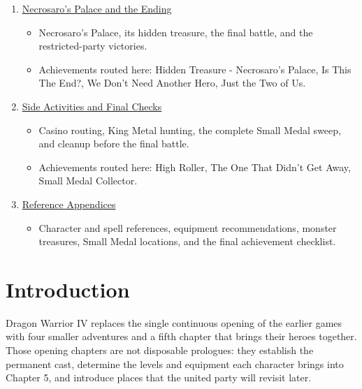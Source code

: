 \documentclass[
  american,
  10pt,
  letterpaper,
  oneside,
  open=any]{scrreprt}
\providecommand{\tightlist}{%
  \setlength{\itemsep}{0pt}\setlength{\parskip}{0pt}}
\begin{document}
\begin{enumerate}
  \begin{itemize}
  \tightlist
  \item
    The Final Cave, the Last Refuge, and the four barrier shrines.
  \item
    Achievements routed here: And Then There Were None.
  \end{itemize}
\item
  \hyperref[necrosaros-palace-and-the-ending]{Necrosaro's Palace and the
  Ending}

  \begin{itemize}
  \tightlist
  \item
    Necrosaro's Palace, its hidden treasure, the final battle, and the
    restricted-party victories.
  \item
    Achievements routed here: Hidden Treasure - Necrosaro's Palace, Is
    This The End?, We Don't Need Another Hero, Just the Two of Us.
  \end{itemize}
\item
  \hyperref[side-activities-and-final-checks]{Side Activities and Final
  Checks}

  \begin{itemize}
  \tightlist
  \item
    Casino routing, King Metal hunting, the complete Small Medal sweep,
    and cleanup before the final battle.
  \item
    Achievements routed here: High Roller, The One That Didn't Get Away,
    Small Medal Collector.
  \end{itemize}
\item
  \hyperref[reference-appendices]{Reference Appendices}

  \begin{itemize}
  \tightlist
  \item
    Character and spell references, equipment recommendations, monster
    treasures, Small Medal locations, and the final achievement
    checklist.
  \end{itemize}
\end{enumerate}

\clearpage{}

\chapter{Introduction}\label{introduction}

Dragon Warrior IV replaces the single continuous opening of the earlier
games with four smaller adventures and a fifth chapter that brings their
heroes together. Those opening chapters are not disposable prologues:
they establish the permanent cast, determine the levels and equipment
each character brings into Chapter 5, and introduce places that the
united party will revisit later.
\end{document}

